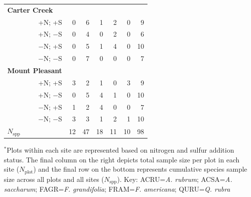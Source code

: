 \begin{table}[h!]
{\begin{tabular}{p{2.5cm}p{1cm}p{1cm}p{1cm}p{1cm}p{1cm}p{1cm}}
        \multicolumn{1}{l}{\textbf{Carter Creek}} &&&&&&       \\
        \multicolumn{1}{r}{+N; +S}      & \multicolumn{1}{r}{0} & \multicolumn{1}{r}{6} & \multicolumn{1}{r}{1} & \multicolumn{1}{r}{2} & \multicolumn{1}{r}{0} & \multicolumn{1}{r}{9}  \\
        \multicolumn{1}{r}{+N; $-$S}    & \multicolumn{1}{r}{0} & \multicolumn{1}{r}{4} & \multicolumn{1}{r}{0} & \multicolumn{1}{r}{2} & \multicolumn{1}{r}{0} & \multicolumn{1}{r}{6}  \\
        \multicolumn{1}{r}{$-$N; +S}    & \multicolumn{1}{r}{0} & \multicolumn{1}{r}{5} & \multicolumn{1}{r}{1} & \multicolumn{1}{r}{4} & \multicolumn{1}{r}{0} & \multicolumn{1}{r}{10} \\
        \multicolumn{1}{r}{$-$N; $-$S}  & \multicolumn{1}{r}{0} & \multicolumn{1}{r}{7} & \multicolumn{1}{r}{0} & \multicolumn{1}{r}{0} & \multicolumn{1}{r}{0} & \multicolumn{1}{r}{7}  \\
        \multicolumn{1}{l}{\textbf{Mount Pleasant}}   &&&&&&    \\
        \multicolumn{1}{r}{+N; +S}      & \multicolumn{1}{r}{3} & \multicolumn{1}{r}{2} & \multicolumn{1}{r}{1} & \multicolumn{1}{r}{0} & \multicolumn{1}{r}{3} & \multicolumn{1}{r}{9}  \\
        \multicolumn{1}{r}{+N; $-$S}    & \multicolumn{1}{r}{0} & \multicolumn{1}{r}{5} & \multicolumn{1}{r}{4} & \multicolumn{1}{r}{1} & \multicolumn{1}{r}{0} & \multicolumn{1}{r}{10} \\
        \multicolumn{1}{r}{$-$N; +S}    & \multicolumn{1}{r}{1} & \multicolumn{1}{r}{2} & \multicolumn{1}{r}{4} & \multicolumn{1}{r}{0} & \multicolumn{1}{r}{0} & \multicolumn{1}{r}{7}  \\
        \multicolumn{1}{r}{$-$N; $-$S}  & \multicolumn{1}{r}{3} & \multicolumn{1}{r}{3} & \multicolumn{1}{r}{1} & \multicolumn{1}{r}{2} & \multicolumn{1}{r}{1} & \multicolumn{1}{r}{10} \\
      \hline
      \multicolumn{1}{l}{$N_\mathrm{spp}$} &  \multicolumn{1}{r}{12} & \multicolumn{1}{r}{47} & \multicolumn{1}{r}{18} & \multicolumn{1}{r}{11} & \multicolumn{1}{r}{10} & \multicolumn{1}{r}{98}
      \end{tabular}%
      }
      \end{table}
      \begin{singlespace}
        \noindent $^*$Plots within each site are represented based on nitrogen and sulfur addition status. The final column on the right depicts total sample size per plot in each site ($N_\mathrm{plot}$) and the final row on the bottom represents cumulative species sample size across all plots and all sites ($N_\mathrm{spp}$). Key: ACRU=\textit{A. rubrum}; ACSA=\textit{A. saccharum}; FAGR=\textit{F. grandifolia}; FRAM=\textit{F. americana}; QURU=\textit{Q. rubra}
      \end{singlespace}
    \clearpage


